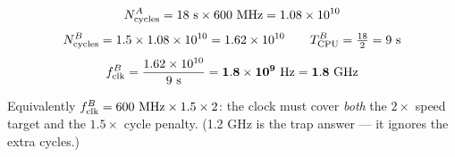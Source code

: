 \begin{answerbox}
$$\cycles^{A} = 18\ \text{s} \times 600\ \text{MHz} = 1.08\times10^{10}$$
$$N_{\mathrm{cycles}}^{B} = 1.5 \times 1.08\times10^{10} = 1.62\times10^{10}
  \qquad T_{\mathrm{CPU}}^{B} = \tfrac{18}{2} = 9\ \text{s}$$
$$\clockrate^{B} = \frac{1.62\times10^{10}}{9\ \text{s}}
  = \mathbf{1.8\times10^{9}\ \text{Hz} = 1.8\ \text{GHz}}$$

\medskip
Equivalently $\clockrate^{B} = 600\ \text{MHz} \times 1.5 \times 2$: the clock
must cover \emph{both} the $2\times$ speed target and the $1.5\times$ cycle
penalty. (1.2 GHz is the trap answer — it ignores the extra cycles.)
\end{answerbox}


